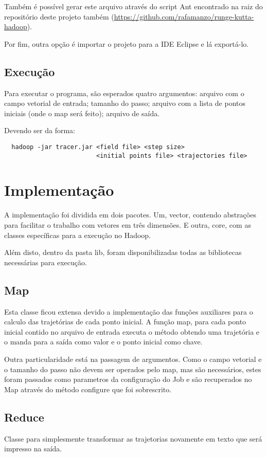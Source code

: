 \documentclass[a4paper,11pt]{report}
\begin{document}
Também é possível gerar este arquivo através do script Ant encontrado na raiz do repositório deste projeto também (\href{https://github.com/rafamanzo/runge-kutta-hadoop}{https://github.com/rafamanzo/runge-kutta-hadoop}).

Por fim, outra  opção é importar o projeto para a IDE Eclipse e lá exportá-lo.

\section{Execução}
Para executar o programa, são esperados quatro argumentos: arquivo com o campo vetorial de entrada; tamanho do passo; arquivo com a lista de pontos iniciais (onde o map será feito); arquivo de saída.

Devendo ser da forma:

\begin{verbatim}
  hadoop -jar tracer.jar <field file> <step size>
                         <initial points file> <trajectories file>
\end{verbatim}

\chapter{Implementação}
A implementação foi dividida em dois pacotes. Um, vector, contendo abstrações para facilitar o trabalho com vetores em três dimensões. E outra, core, com as classes específicas para a execução no Hadoop.

Além disto, dentro da pasta lib, foram disponibilizadas todas as bibliotecas necessárias para execução.

\section{Map}
Esta classe ficou extensa devido a implementação das funções auxiliares para o calculo das trajetórias de cada ponto inicial. A função map, para cada ponto inicial contido no arquivo de entrada executa o método obtendo uma trajetória e o manda para a saída como valor e o ponto inicial como chave.

Outra particularidade está na passagem de argumentos. Como o campo vetorial e o tamanho do passo não devem ser operados pelo map, mas são necessários, estes foram passados como parametros da configuração do Job e são recuperados no Map através do método configure que foi sobrescrito.

\section{Reduce}
Classe para simplesmente transformar as trajetorias novamente em texto que será impresso na saída.
\end{document}
